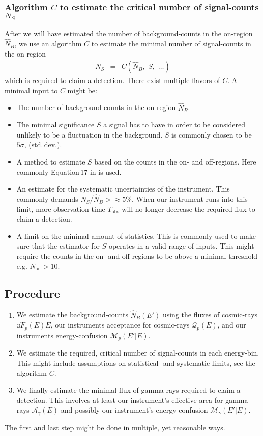 \documentclass{article}%
\begin{document}
\subsubsection*{Algorithm $C$ to estimate the critical number of signal-counts $N_S$}
%
After we will have estimated the number of background-counts in the on-region $\hat{N}_B$, we use an algorithm $C$ to estimate the minimal number of signal-counts in the on-region
%
\begin{eqnarray*}
N_S &=& C(\hat{N}_B,\,\,S,\,\,\dots)
\end{eqnarray*}
%
which is required to claim a detection.
%
There exist multiple flavors of $C$.
%
A minimal input to $C$ might be:
%
\begin{itemize}
%
\item{} The number of background-counts in the on-region $\hat{N}_B$.
%
\item{} The minimal significance $S$ a signal has to have in order to be considered unlikely to be a fluctuation in the background.
%
$S$ is commonly chosen to be $5\sigma$, (std.\,dev.).
%
\item{} A method to estimate $S$ based on the counts in the on- and off-regions. Here commonly Equation\,17 in \cite{li1983analysis} is used.
%
\item{} An estimate for the systematic uncertainties of the instrument. This commonly demands $N_S/\hat{N}_B >\approx 5\%$.
%
When our instrument runs into this limit, more observation-time $T_\text{obs}$ will no longer decrease the required flux to claim a detection.
%
\item{}
A limit on the minimal amount of statistics. This is commonly used to make sure that the estimator for $S$ operates in a valid range of inputs.
%
This might require the counts in the on- and off-regions to be above a minimal threshold e.g. $N_\text{on} > 10$.
%
\end{itemize}
%
\subsection{Procedure}
%
\begin{enumerate}
\item We estimate the background-counts $\hat{N}_B(E')$ using the fluxes of cosmic-rays $\dd{F_p(E)}{E}$, our instruments acceptance for cosmic-rays $\mathcal{Q}_p(E)$, and our instruments energy-confusion $\mathcal{M}_p(E'\vert E)$.
%
\item We estimate the required, critical number of signal-counts in each energy-bin. This might include assumptions on statistical- and systematic limits, see the algorithm $C$.
%
\item We finally estimate the minimal flux of gamma-rays required to claim a detection. This involves at least our instrument's effective area for gamma-rays $\mathcal{A}_\gamma(E)$ and possibly our instrument's energy-confusion $\mathcal{M}_{\gamma}(E'\vert E)$.
%
\end{enumerate}
%
The first and last step might be done in multiple, yet reasonable ways.
%
\end{document}
